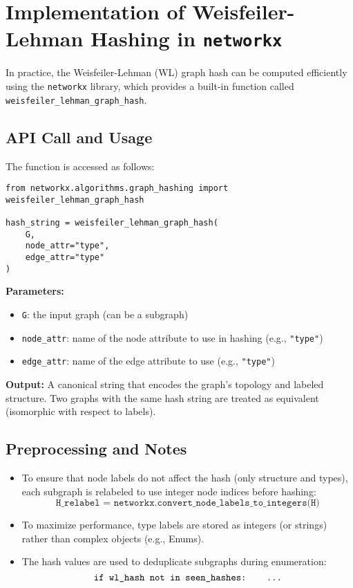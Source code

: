 \documentclass{article}
\begin{document}
\section*{Implementation of Weisfeiler-Lehman Hashing in \texttt{networkx}}

In practice, the Weisfeiler-Lehman (WL) graph hash can be computed efficiently using the \texttt{networkx} library, which provides a built-in function called \texttt{weisfeiler\_lehman\_graph\_hash}.

\subsection*{API Call and Usage}

The function is accessed as follows:

\begin{verbatim}
from networkx.algorithms.graph_hashing import weisfeiler_lehman_graph_hash

hash_string = weisfeiler_lehman_graph_hash(
    G, 
    node_attr="type", 
    edge_attr="type"
)
\end{verbatim}

\textbf{Parameters:}
\begin{itemize}
    \item \texttt{G}: the input graph (can be a subgraph)
    \item \texttt{node\_attr}: name of the node attribute to use in hashing (e.g., \texttt{"type"})
    \item \texttt{edge\_attr}: name of the edge attribute to use (e.g., \texttt{"type"})
\end{itemize}

\textbf{Output:} A canonical string that encodes the graph’s topology and labeled structure. Two graphs with the same hash string are treated as equivalent (isomorphic with respect to labels).

\subsection*{Preprocessing and Notes}

\begin{itemize}
    \item To ensure that node labels do not affect the hash (only structure and types), each subgraph is relabeled to use integer node indices before hashing:
    \[
    \texttt{H\_relabel = networkx.convert\_node\_labels\_to\_integers(H)}
    \]
    
    \item To maximize performance, type labels are stored as integers (or strings) rather than complex objects (e.g., Enums).
    
    \item The hash values are used to deduplicate subgraphs during enumeration:
    \[
    \texttt{if wl\_hash not in seen\_hashes: \quad \ldots}
    \]
\end{itemize}
\end{document}
